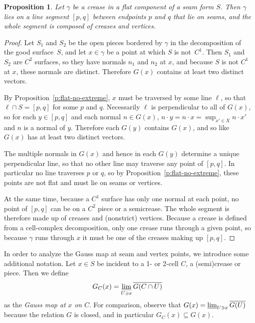 \documentclass{article}
\newtheorem{proposition}[theorem]{Proposition}
\newcommand\term[1]{{\it #1}}
\begin{document}
\begin{proposition}\label{p:flat-crease-segment}
  Let $\gamma$ be a crease in a flat component of a seam form $S$.
  Then $\gamma$ lies on a line segment $[p,q]$ between endpoints $p$ and $q$
  that lie on seams, and the whole segment is composed of creases and vertices.
\end{proposition}
\begin{proof}
  Let $S_1$ and $S_2$ be the open pieces bordered by $\gamma$
  in the decomposition of the good surface~$S$,
  and let $x \in \gamma$ be a point at which $S$ is not~$C^1$.
  Then $S_1$ and $S_2$ are $C^2$ surfaces,
  so they have normals $n_1$ and $n_2$ at $x$,
  and because $S$ is not $C^1$ at $x$, these normals are distinct.
  Therefore $G(x)$ contains at least two distinct vectors.

  By Proposition~\ref{p:flat-no-extreme}, $x$ must be traversed by
  some line $\ell$, so that $\ell \cap S = [p, q]$ for some $p$ and $q$.
  Necessarily $\ell$ is perpendicular to all of $G(x)$,
  so for each $y \in [p, q]$ and each normal $n \in G(x)$,
  $n \cdot y = n \cdot x = \sup_{x' \in X} n \cdot x'$ and $n$ is a
  normal of $y$.  Therefore each $G(y)$ contains $G(x)$, and
  so like $G(x)$ has at least
  two distinct vectors.

  The multiple normals in $G(x)$ and hence in each $G(y)$ determine a unique perpendicular line, so
  that no other line may traverse any point of $[p, q]$.  In
  particular no line traverses $p$ or $q$, so by
  Proposition~\ref{p:flat-no-extreme}, these points are not flat and
  must lie on seams or vertices.

  At the same time, because a $C^1$ surface has only one normal at
  each point, no point of $[p, q]$ can be on a $C^2$ piece or a
  semicrease.  The whole segment is therefore made up of creases and
  (nonstrict) vertices.  Because a crease is defined from a
  cell-complex decomposition, only one crease runs through a given
  point, so because $\gamma$ runs through $x$ it must be one of the
  creases making up $[p, q]$.
\end{proof}

In order to analyze the Gauss map at seam and vertex points, we
introduce some additional notation.  Let $x \in S$ be incident to a
1- or 2-cell $C$, a (semi)crease or piece.  Then we define
$$ G_C(x) = \varliminf_{U \ni x} \overline{G(C \cap U)} $$
as the \term{Gauss map at $x$ on $C$}.  For comparison,
observe that $G(x) = \varliminf_{U \ni x} \overline{G(U)}$ because the relation
$G$ is closed, and in particular $G_C(x) \subseteq G(x)$.
\end{document}
